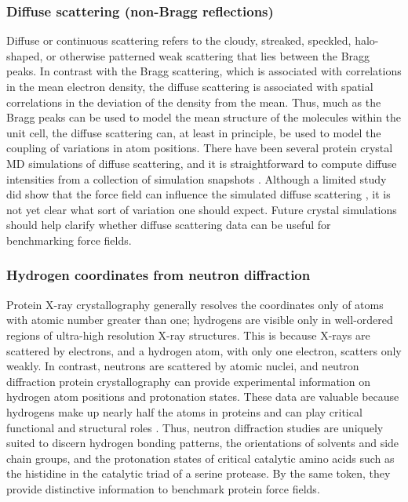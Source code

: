 \documentclass[9pt,review]{livecoms}
\begin{document}
\subsubsection{Diffuse scattering (non-Bragg reflections)}
\label{sub2:diffuse}

Diffuse or continuous scattering refers to the cloudy, streaked, speckled, halo-shaped, or otherwise patterned weak scattering that lies between the Bragg peaks.
In contrast with the Bragg scattering, which is associated with correlations in the mean electron density, the diffuse scattering is associated with spatial correlations in the deviation of the density from the mean.
Thus, much as the Bragg peaks can be used to model the mean structure of the molecules within the unit cell, the diffuse scattering can, at least in principle, be used to model the coupling of variations in atom positions.
There have been several protein crystal MD simulations of diffuse scattering, and it is straightforward to compute diffuse intensities from a collection of simulation snapshots \cite{faure_correlated_1994,clarage_sampling_1995,hery_x-ray_1998,meinhold_fluctuations_2005,wall_conformational_2014,wall_internal_2018,wych_liquid-like_2019,meisburger_diffuse_2020,meisburger_robust_2023}.
Although a limited study did show that the force field can influence the simulated diffuse scattering \cite{wych_liquid-like_2019}, it is not yet clear what sort of variation one should expect.
Future crystal simulations should help clarify whether diffuse scattering data can be useful for benchmarking force fields.

\subsubsection{Hydrogen coordinates from neutron diffraction}
\label{sub2:neutron}

Protein X-ray crystallography generally resolves the coordinates only of atoms with atomic number greater than one; hydrogens are visible only in well-ordered regions of ultra-high resolution X-ray structures.
This is because X-rays are scattered by electrons, and a hydrogen atom, with only one electron, scatters only weakly.
In contrast, neutrons are scattered by atomic nuclei, and neutron diffraction protein crystallography can provide experimental information on hydrogen atom positions and protonation states.
These data are valuable because hydrogens make up nearly half the atoms in proteins and can play critical functional and structural roles \cite{word_asparagine_1999,word_visualizing_1999}.
Thus, neutron diffraction studies are uniquely suited to discern hydrogen bonding patterns, the orientations of solvents and side chain groups, and the protonation states of critical catalytic amino acids such as the histidine in the catalytic triad of a serine protease.
By the same token, they provide distinctive information to benchmark protein force fields.
\end{document}

